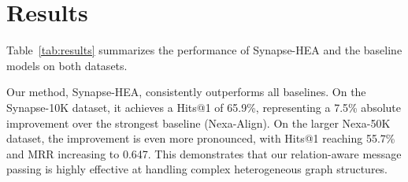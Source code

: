 \section{Results}
Table~\ref{tab:results} summarizes the performance of Synapse-HEA and the baseline models on both datasets. 

Our method, Synapse-HEA, consistently outperforms all baselines. On the Synapse-10K dataset, it achieves a Hits@1 of 65.9\%, representing a 7.5\% absolute improvement over the strongest baseline (Nexa-Align). On the larger Nexa-50K dataset, the improvement is even more pronounced, with Hits@1 reaching 55.7\% and MRR increasing to 0.647. This demonstrates that our relation-aware message passing is highly effective at handling complex heterogeneous graph structures.
